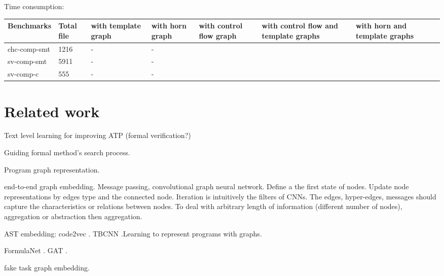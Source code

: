 \documentclass{article}
\begin{document}
Time consumption:
\begin{center}
\begin{tabular}{lp{1cm}p{1cm}p{1cm}p{1cm}p{1cm}p{1cm}p{1cm} }
\hline
Benchmarks  & Total file & with template graph & with horn graph & with control flow graph &with control flow and template graphs & with horn and template graphs\\
\hline
chc-comp-smt  & 1216 & -&-\\
sv-comp-smt  & 5911 & -&-\\
sv-comp-c  & 555 & -&-\\
\hline
\end{tabular}
\end{center}

\section{Related work}

Text level learning for improving ATP (formal verification?) \cite{NIPS2016_6280}

Guiding formal method's search process.

Program graph representation.

end-to-end graph embedding. Message passing, convolutional graph neural network.
Define a the first state of nodes. Update node representations by edges type and the connected node. Iteration is intuitively the filters of CNNs.
The edges, hyper-edges, messages should capture the characteristics or relations between nodes.
To deal with arbitrary length of information (different number of nodes), aggregation or abstraction then aggregation.

AST embedding: code2vec \cite{Alon:2019:CLD:3302515.3290353}. TBCNN \cite{DBLP:journals/corr/MouLJZW14}.Learning to represent programs with graphs\cite{DBLP:journals/corr/abs-1711-00740}.


FormulaNet \cite{NIPS2017_6871}. GAT \cite{2017arXiv171010903V}.


fake task graph embedding.




%
%
%
%
\end{document}
